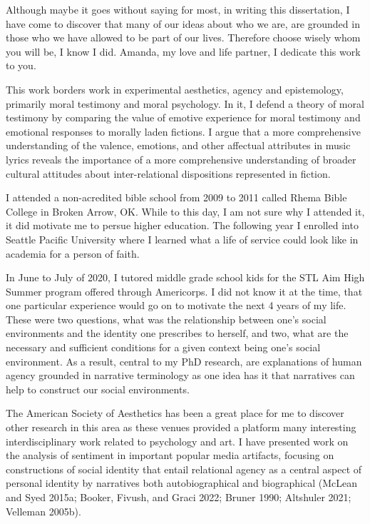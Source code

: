 \documentclass[phdthesis,12pt,final]{wuthesis}
\theoremstyle{definition}
\theoremstyle{definition}
\theoremstyle{definition}
\theoremstyle{definition}
\theoremstyle{remark}
\begin{document}
\cleardoublepage
\begin{thesisdedicationpage}
Although maybe it goes without saying for most, in writing this dissertation, I have come to discover that many of our ideas about who we are, are grounded in those who we have allowed to be part of our lives. Therefore choose wisely whom you will be, I know I did. Amanda, my love and life partner, I dedicate this work to you.
\end{thesisdedicationpage}

\cleardoublepage
\begin{thesisacknowledgments}
This work borders work in experimental aesthetics, agency and epistemology, primarily moral testimony and moral psychology. In it, I defend a theory of moral testimony by comparing the value of emotive experience for moral testimony and emotional responses to morally laden fictions. I argue that a more comprehensive understanding of the valence, emotions, and other affectual attributes in music lyrics reveals the importance of a more comprehensive understanding of broader cultural attitudes about inter-relational dispositions represented in fiction.

I attended a non-acredited bible school from 2009 to 2011 called Rhema Bible College in Broken Arrow, OK. While to this day, I am not sure why I attended it, it did motivate me to persue higher education. The following year I enrolled into Seattle Pacific University where I learned what a life of service could look like in academia for a person of faith.

In June to July of 2020, I tutored middle grade school kids for the STL Aim High Summer program offered through Americorps. I did not know it at the time, that one particular experience would go on to motivate the next 4 years of my life. These were two questions, what was the relationship between one's social environments and the identity one prescribes to herself, and two, what are the necessary and sufficient conditions for a given context being one's social environment. As a result, central to my PhD research, are explanations of human agency grounded in narrative terminology as one idea has it that narratives can help to construct our social environments.

The American Society of Aesthetics has been a great place for me to discover other research in this area as these venues provided a platform many interesting interdisciplinary work related to psychology and art. I have presented work on the analysis of sentiment in important popular media artifacts, focusing on constructions of social identity that entail relational agency as a central aspect of personal identity by narratives both autobiographical and biographical (McLean and Syed 2015a; Booker, Fivush, and Graci 2022; Bruner 1990; Altshuler 2021; Velleman 2005b).


\end{thesisacknowledgments}
\end{document}
